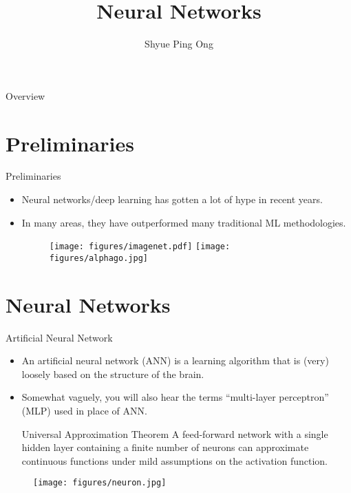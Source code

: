 \documentclass[aspectratio=169]{beamer}
\title[Neural Networks]{Neural Networks}
\author{Shyue Ping Ong}
\institute[UCSD]{University of California, San Diego\\
\medskip
}
\date{\classyear} %
\begin{document}
\begin{frame}
    \titlepage %
\end{frame}


\begin{frame}{Overview}
    \tableofcontents
\end{frame}


\section{Preliminaries}

\begin{frame}{Preliminaries}
    \begin{itemize}
        \item Neural networks/deep learning has gotten a lot of hype in recent years.
        \item In many areas, they have outperformed many traditional ML methodologies.
    \begin{figure}
        \centering
        \texttt{[image: figures/imagenet.pdf]}
        \texttt{[image: figures/alphago.jpg]}
    \end{figure}
    \end{itemize}

\end{frame}

\section{Neural Networks}


\begin{frame}{Artificial Neural Network}
\begin{itemize}
        \item An artificial neural network (ANN) is a learning algorithm that is (very) loosely based on the structure of the brain.
        \item Somewhat vaguely, you will also hear the terms ``multi-layer perceptron'' (MLP) used in place of ANN.
        \begin{block}{Universal Approximation Theorem\cite{csajiApproximationArtificialNeural2001}}
        A feed-forward network with a single hidden layer containing a finite number of neurons can approximate continuous functions under mild assumptions on the activation function. 
        \end{block}
\end{itemize}
\begin{figure}
        \centering
        \texttt{[image: figures/neuron.jpg]}
    \end{figure}
\end{frame}
\end{document}
